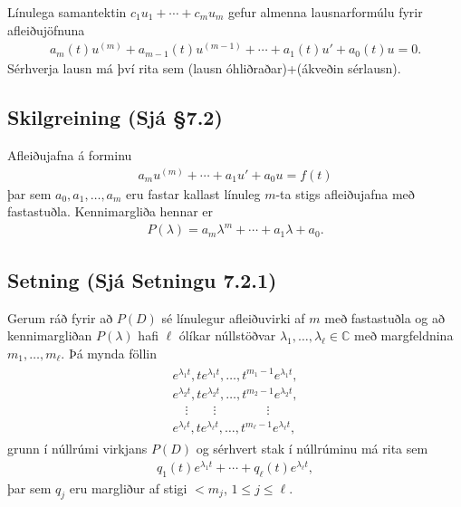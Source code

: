 \documentclass[a4paper,10pt,icelandic]{sphinxmanual}
\begin{document}
Línulega samantektin \(c_1u_1+\cdots+c_mu_m\) gefur almenna lausnarformúlu fyrir afleiðujöfnuna
\begin{equation*}
\begin{split}a_m(t)u^{(m)}+a_{m-1}(t)u^{(m-1)}+\cdots+a_1(t)u'+a_0(t)u=0.\end{split}
\end{equation*}
Sérhverja lausn má því rita sem (lausn óhliðraðar)+(ákveðin sérlausn).


\subsection{Skilgreining  (Sjá \S{}7.2)}
\label{\detokenize{Kafli07:skilgreining-sja-7-2}}
Afleiðujafna á forminu
\begin{equation*}
\begin{split}a_mu^{(m)}+\cdots + a_1u'+a_0u=f(t)\end{split}
\end{equation*}
þar sem \(a_0, a_1, \ldots, a_m\) eru fastar kallast línuleg \(m\)-ta stigs afleiðujafna með fastastuðla. Kennimargliða hennar er
\begin{equation*}
\begin{split}P(\lambda)=a_m\lambda^{m}+\cdots + a_1\lambda+a_0.\end{split}
\end{equation*}

\subsection{Setning (Sjá Setningu 7.2.1)}
\label{\detokenize{Kafli07:setning-sja-setningu-7-2-1}}
Gerum ráð fyrir að \(P(D)\) sé línulegur afleiðuvirki af \(m\) með fastastuðla og að kennimargliðan \(P(\lambda)\) hafi \(\ell\) ólíkar núllstöðvar \(\lambda_1,\dots,\lambda_\ell\in {\mathbb{C}}\) með margfeldnina \(m_1,\dots,m_\ell\). Þá mynda föllin
\begin{equation*}
\begin{split}\begin{gathered}
e^{\lambda_1t}, te^{\lambda_1t},\dots, t^{m_1-1}e^{\lambda_1t},\\
e^{\lambda_2t}, te^{\lambda_2t},\dots, t^{m_2-1}e^{\lambda_2t},\\
\quad \vdots\qquad \vdots \qquad \qquad \vdots\\
e^{\lambda_\ell t}, te^{\lambda_\ell t},\dots, t^{m_\ell-1}e^{\lambda_\ell t},\end{gathered}\end{split}
\end{equation*}
grunn í núllrúmi virkjans \(P(D)\) og sérhvert stak í núllrúminu má rita sem
\begin{equation*}
\begin{split}q_1(t)e^{\lambda_1t}+\cdots+q_\ell(t)e^{\lambda_\ell t},\end{split}
\end{equation*}
þar sem \(q_j\) eru margliður af stigi \(<m_j\),
\(1\leq j\leq \ell\).
\end{document}
